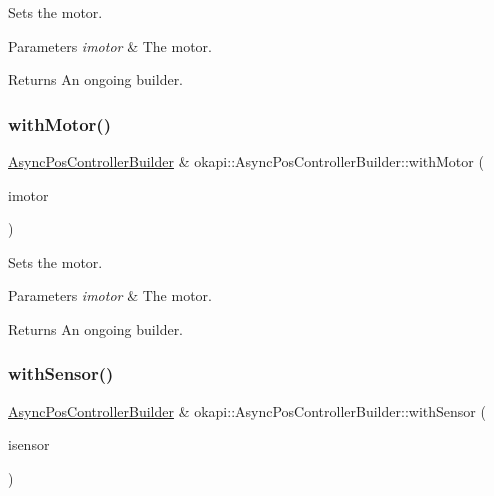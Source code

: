 Sets the motor.


\begin{DoxyParams}{Parameters}
{\em imotor} & The motor. \\
\hline
\end{DoxyParams}
\begin{DoxyReturn}{Returns}
An ongoing builder. 
\end{DoxyReturn}
\mbox{\label{classokapi_1_1AsyncPosControllerBuilder_a837f30643945bf8a5522c9a374ec98dc}} 
\subsubsection{\texorpdfstring{withMotor()}{withMotor()}\hspace{0.1cm}{\footnotesize\ttfamily [3/3]}}
{\footnotesize\ttfamily \mbox{\hyperlink{classokapi_1_1AsyncPosControllerBuilder}{Async\+Pos\+Controller\+Builder}} \& okapi\+::\+Async\+Pos\+Controller\+Builder\+::with\+Motor (\begin{DoxyParamCaption}\item[{const std\+::shared\+\_\+ptr$<$ \mbox{\hyperlink{classokapi_1_1AbstractMotor}{Abstract\+Motor}} $>$ \&}]{imotor }\end{DoxyParamCaption})}

Sets the motor.


\begin{DoxyParams}{Parameters}
{\em imotor} & The motor. \\
\hline
\end{DoxyParams}
\begin{DoxyReturn}{Returns}
An ongoing builder. 
\end{DoxyReturn}
\mbox{\label{classokapi_1_1AsyncPosControllerBuilder_aab579369bc48c43c207cecc23d20b424}} 
\subsubsection{\texorpdfstring{withSensor()}{withSensor()}\hspace{0.1cm}{\footnotesize\ttfamily [1/3]}}
{\footnotesize\ttfamily \mbox{\hyperlink{classokapi_1_1AsyncPosControllerBuilder}{Async\+Pos\+Controller\+Builder}} \& okapi\+::\+Async\+Pos\+Controller\+Builder\+::with\+Sensor (\begin{DoxyParamCaption}\item[{const \mbox{\hyperlink{classokapi_1_1ADIEncoder}{A\+D\+I\+Encoder}} \&}]{isensor }\end{DoxyParamCaption})}

